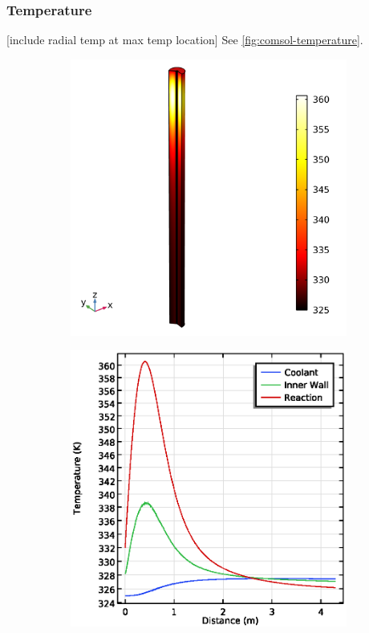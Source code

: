 \subsubsection{Temperature}
[include radial temp at max temp location]
See \cref{fig:comsol-temperature}.

\begin{figure}[h]
    \centering

    \begin{subfigure}{0.49\linewidth}
        \includegraphics[width=\linewidth, scale=0.5]{figures/temperature-surface.png}
        \caption{}
        \label{fig:comsol-temperature:surface}
    \end{subfigure}
    \begin{subfigure}{0.49\linewidth}
        \includegraphics[width=\linewidth, scale=0.5]{figures/temperature-lines.eps}

\end{subfigure}
\end{figure}
